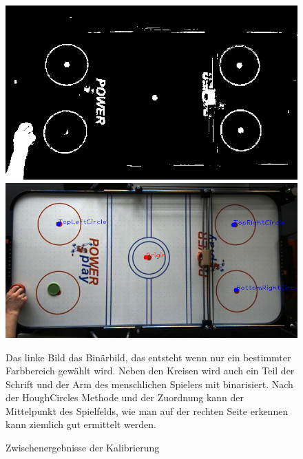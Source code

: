 \begin{figure} [h]
\begin{minipage}[t]{0.4\textwidth}
\vspace{0pt}
\includegraphics[scale =0.3]{images/kalib_bin}


\end{minipage}
\hspace{0.1\textwidth}
\begin{minipage}[t]{0.4\textwidth}
\vspace{0pt}
\includegraphics[scale =0.3]{images/kalib_circ}

\end{minipage}
 \caption{Zwischenergebnisse der Kalibrierung}
 \label{kalib_process}

Das linke Bild das Binärbild, das entsteht wenn nur ein bestimmter Farbbereich gewählt wird. Neben den Kreisen wird auch ein Teil der Schrift und der Arm des menschlichen Spielers mit binarisiert. Nach der HoughCircles Methode und der Zuordnung kann der Mittelpunkt des Spielfelds, wie man auf der rechten Seite erkennen kann ziemlich gut ermittelt werden.
\end{figure}


